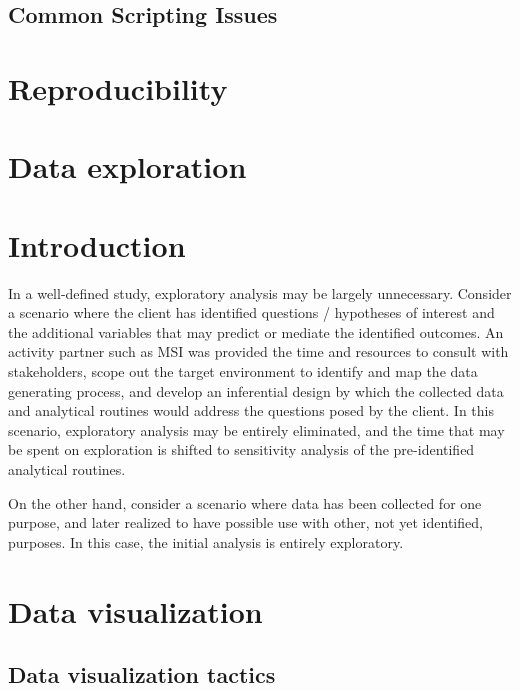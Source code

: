 \documentclass[
  letterpaper,
  DIV=11,
  numbers=noendperiod]{scrreprt}
\begin{document}
\section{Common Scripting Issues}\label{common-scripting-issues}

\chapter{Reproducibility}\label{reproducibility}

\chapter{Data exploration}\label{data-exploration}

\chapter{Introduction}\label{introduction-2}

In a well-defined study, exploratory analysis may be largely
unnecessary. Consider a scenario where the client has identified
questions / hypotheses of interest and the additional variables that may
predict or mediate the identified outcomes. An activity partner such as
MSI was provided the time and resources to consult with stakeholders,
scope out the target environment to identify and map the data generating
process, and develop an inferential design by which the collected data
and analytical routines would address the questions posed by the client.
In this scenario, exploratory analysis may be entirely eliminated, and
the time that may be spent on exploration is shifted to sensitivity
analysis of the pre-identified analytical routines.

On the other hand, consider a scenario where data has been collected for
one purpose, and later realized to have possible use with other, not yet
identified, purposes. In this case, the initial analysis is entirely
exploratory.

\chapter{Data visualization}\label{data-visualization}

\section{Data visualization tactics}\label{data-visualization-tactics}
\end{document}
